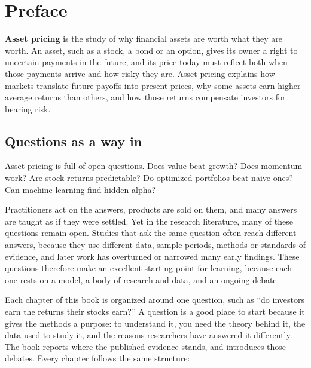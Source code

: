 \chapter*{Preface}

\textbf{Asset pricing} is the study of why financial assets are worth what they are worth. An asset, such as a stock, a bond or an option, gives its owner a right to uncertain payments in the future, and its price today must reflect both when those payments arrive and how risky they are. Asset pricing explains how markets translate future payoffs into present prices, why some assets earn higher average returns than others, and how those returns compensate investors for bearing risk.

\section*{Questions as a way in}

Asset pricing is full of open questions. Does value beat growth? Does momentum work? Are stock returns predictable? Do optimized portfolios beat naive ones? Can machine learning find hidden alpha?

Practitioners act on the answers, products are sold on them, and many answers are taught as if they were settled. Yet in the research literature, many of these questions remain open. Studies that ask the same question often reach different answers, because they use different data, sample periods, methods or standards of evidence, and later work has overturned or narrowed many early findings. These questions therefore make an excellent starting point for learning, because each one rests on a model, a body of research and data, and an ongoing debate.

Each chapter of this book is organized around one question, such as ``do investors earn the returns their stocks earn?'' A question is a good place to start because it gives the methods a purpose: to understand it, you need the theory behind it, the data used to study it, and the reasons researchers have answered it differently. The book reports where the published evidence stands, and introduces those debates. Every chapter follows the same structure:

